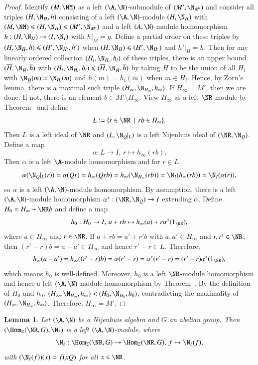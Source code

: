 \documentclass[12pt]{amsart}
\newtheorem{lemma}[theorem]{Lemma}
\theoremstyle{definition}
\renewcommand\leq{\leqslant}
\begin{document}
\begin{proof}
Identify $(M,\NM)$ as a left $(\A,\N)$-submodule of $(M',\N_{M'})$ and consider all triples $(H,\N_H, h)$ consisting of a left $(\A,\N)$-module $(H,\N_H)$ with $(M, \NM) \leq (H,\N_H) \leq (M',\N_{M'})$ and a left $(A,\N)$-module homomorphism $h: (H,\N_H) \rightarrow (I,\N_I)$ with $h|_{M}=g$. Define a partial order on these triples by $(H,\N_H, h) \leq (H',\N_{H'}, h')$ when $(H,\N_H) \leq (H',\N_{H'})$ and $h'|_{H}=h$. Then for any linearly ordered collection $(H_i, \N_{H_i},h_i)$ of these triples, there is an upper bound $(\overline{H}, \N_{\overline{H}}, \overline{h})$ with $(H_i, \N_{H_i}, h_i) \leq (\overline{H}, \N_{\overline{H}}, \overline{h})$ by taking $\overline{H}$ to be the union of all $H_i$ with $\N_{\overline{H}}(m)=\N_{H_i}(m)$ and $\overline{h}(m)=h_i(m)$ when $m \in H_i$. Hence, by Zorn's lemma, there is a maximal such triple $(H_{\infty}, \N_{H_{\infty}}, h_{\infty})$. If $H_{\infty}=M'$, then we are done. If not, there is an element $b \in M' \setminus H_{\infty}$. View $H_{\infty}$ as a left $\NR$-module by Theorem~ and define
\[
L :=\{ r \in \NR \, \mid \, rb \in H_{\infty}\}.
\]
Then $L$ is a left ideal of $\NR$ and $(L, \N_Q|_L)$ is a left Nijenhuis ideal of $(\NR,\N_Q)$. Define a map 
\[
\alpha: L \rightarrow I, \, r \mapsto h_{\infty}(rb).
\]
Then $\alpha$ is a left $\A$-module homomorphism and for $r \in L$,
\[
\alpha(\N_Q|_L(r))=\alpha(Qr)=h_{\infty}(Qrb)=h_{\infty}(\N_{H_{\infty}}(rb))=\N_I(h_{\infty}(rb))=\N_I(\alpha(r)),
\]
so $\alpha$ is a left $(\A,\N)$-module homomorphism. By assumption, there is a left $(\A,\N)$-module homomorphism $\alpha^{\ast}: (\NR, \N_Q) \rightarrow I$ extending $\alpha$.
Define $H_0=H_{\infty}+ \NR b$ and define a map
\[
h_0: H_0 \rightarrow I, \, a+rb \mapsto h_{\infty}(a)+r \alpha^{\ast}(1_{\NR}), 
\]
where $a \in H_{\infty}$ and $r \in \NR$. If $a+rb=a'+r'b$ with $a,a' \in H_{\infty}$ and $r,r' \in \NR$, then $(r'-r)b=a-a' \in H_{\infty}$ and hence $r'-r \in L$. Therefore,
\[
h_{\infty}(a-a')=h_{\infty}((r'-r)b)=\alpha(r'-r)=\alpha^{\ast}(r'-r)=(r'-r) \alpha^{\ast} (1_{\NR}),
\]
which means $h_0$ is well-defined. Moreover, $h_0$ is a left $\NR$-module homomorphism and hence a left $(\A,\N)$-module homomorphism by Theorem~. By the definition of $H_0$ and $h_0$, $(H_{\infty}, \N_{H_{\infty}}, h_{\infty}) <(H_0, \N_{H_0}, h_0)$, contradicting the maximality of $(H_{\infty}, \N_{H_{\infty}}, h_{\infty})$. Therefore, $H_{\infty}=M'$.
\end{proof}

\begin{lemma}
Let $(\A,\N)$ be a Nijenhuis algebra and $G$ an abelian group. Then $(\Hom_{\mathbb{Z}}(\NR, G), \N_{\ell})$ is a left $(\A,\N)$-module, where
\begin{align*}
\N_{\ell}:\Hom_{\mathbb{Z}}(\NR, G) \rightarrow \Hom_{\mathbb{Z}}(\NR, G),\, f \mapsto \N_{\ell}(f), 
\end{align*}
with $(\N_{\ell}(f))(x)=f(xQ)$ for all $x \in \NR$.
\end{lemma}
\end{document}
